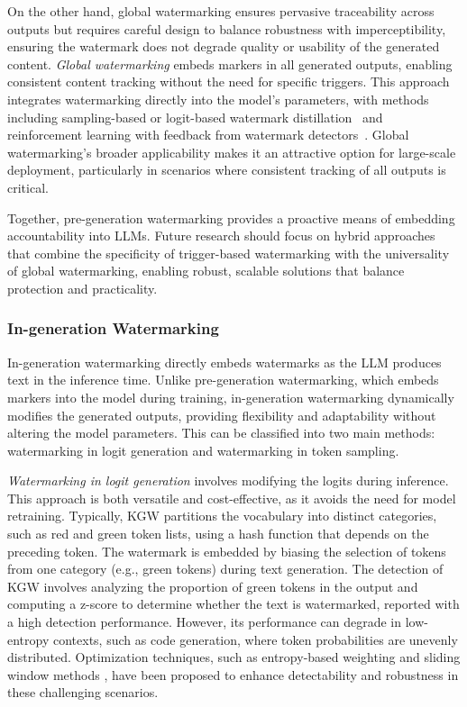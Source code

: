 On the other hand, global watermarking ensures pervasive traceability across outputs but requires careful design to balance robustness with imperceptibility, ensuring the watermark does not degrade quality or usability of the generated content. \textit{Global watermarking} embeds markers in all generated outputs, enabling consistent content tracking without the need for specific triggers. This approach integrates watermarking directly into the model's parameters, with methods including sampling-based or logit-based watermark distillation~\cite{gu2023learnability} and reinforcement learning with feedback from watermark detectors~\cite{learninglearning}. Global watermarking's broader applicability makes it an attractive option for large-scale deployment, particularly in scenarios where consistent tracking of all outputs is critical.

Together, pre-generation watermarking provides a proactive means of embedding accountability into LLMs. Future research should focus on hybrid approaches that combine the specificity of trigger-based watermarking with the universality of global watermarking, enabling robust, scalable solutions that balance protection and practicality.


\subsubsection{In-generation Watermarking} 

In-generation watermarking directly embeds watermarks as the LLM produces text in the inference time. Unlike pre-generation watermarking, which embeds markers into the model during training, in-generation watermarking dynamically modifies the generated outputs, providing flexibility and adaptability without altering the model parameters. This can be classified into two main methods: watermarking in logit generation and watermarking in token sampling.

 \textit{Watermarking in logit generation} involves modifying the logits during inference. This approach is both versatile and cost-effective, as it avoids the need for model retraining. Typically, KGW \cite{kirchenbauer2023watermark} partitions the vocabulary into distinct categories, such as red and green token lists, using a hash function that depends on the preceding token. The watermark is embedded by biasing the selection of tokens from one category (e.g., green tokens) during text generation. The detection of KGW involves analyzing the proportion of green tokens in the output and computing a z-score to determine whether the text is watermarked, reported with a high detection performance.  However, its performance can degrade in low-entropy contexts, such as code generation, where token probabilities are unevenly distributed. Optimization techniques, such as entropy-based weighting \cite{lu2024entropy} and sliding window methods \cite{kirchenbauer2023reliability}, have been proposed to enhance detectability and robustness in these challenging scenarios.


